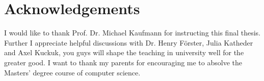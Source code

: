 \section{Acknowledgements}
I would like to thank Prof. Dr. Michael Kaufmann for instructing this final thesis. Further I appreciate helpful discussions with Dr. Henry Förster, Julia Katheder and Axel Kuckuk, you guys will shape the teaching in university well for the greater good. I want to thank my parents for encouraging me to absolve the Masters' degree course of computer science. 